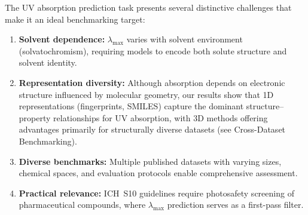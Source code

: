 \documentclass[journal=jcisd8,manuscript=article]{achemso}
\begin{document}
The UV absorption prediction task presents several distinctive challenges that make it an ideal benchmarking target:
\begin{enumerate}
    \item \textbf{Solvent dependence:} $\lambda_{\max}$ varies with solvent environment (solvatochromism), requiring models to encode both solute structure and solvent identity.
    \item \textbf{Representation diversity:} Although absorption depends on electronic structure influenced by molecular geometry, our results show that 1D representations (fingerprints, SMILES) capture the dominant structure--property relationships for UV absorption, with 3D methods offering advantages primarily for structurally diverse datasets (see Cross-Dataset Benchmarking).
    \item \textbf{Diverse benchmarks:} Multiple published datasets with varying sizes, chemical spaces, and evaluation protocols enable comprehensive assessment.
    \item \textbf{Practical relevance:} ICH~S10 guidelines require photosafety screening of pharmaceutical compounds, where $\lambda_{\max}$ prediction serves as a first-pass filter.
\end{enumerate}
\end{document}
